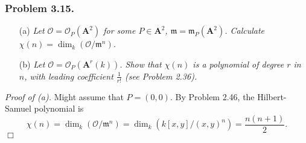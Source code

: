 \documentclass{article}
\begin{document}



\subsubsection*{Problem 3.15.}
\begin{enumerate}
\item[(a)]
  \emph{Let $\mathscr{O} = \mathscr{O}_P(\mathbf{A}^2)$ for some $P \in \mathbf{A}^2$,
  $\mathfrak{m} = \mathfrak{m}_P(\mathbf{A}^2)$.
  Calculate $\chi(n) = \dim_k(\mathscr{O}/\mathfrak{m}^n)$.}

\item[(b)]
  \emph{Let $\mathscr{O} = \mathscr{O}_P(\mathbf{A}^r(k))$.
  Show that $\chi(n)$ is a polynomial of degree $r$ in $n$,
  with leading coefficient $\frac{1}{r!}$ (see Problem 2.36).} \\
\end{enumerate}



\emph{Proof of (a).}
  Might assume that $P = (0,0)$.
  By Problem 2.46, the Hilbert-Samuel polynomial is
  \[
    \chi(n)
    = \dim_k(\mathscr{O}/\mathfrak{m}^n)
    = \dim_k(k[x,y]/(x,y)^n)
    = \frac{n(n+1)}{2}.
  \]
$\Box$ \\
\end{document}
